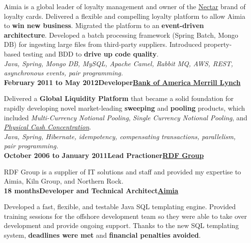\documentclass[a4paper,12pt]{article}
\newcommand{\clientwork}[3]{\textbf{#1\hfill#3\hfill#2}\nopagebreak}
\newcommand{\renewals}[1]{}
\newcommand{\techstack}[1]{\textit{#1}}
\begin{document}
Aimia is a global leader of loyalty management and owner of the \href{http://www.nectar.com/}{Nectar} brand of loyalty cards. Delivered a flexible and compelling loyalty platform to allow Aimia to \textbf{win new business}. Migrated the platform to an \textbf{event-driven architecture}. Developed a batch processing framework (Spring Batch, Mongo DB) for ingesting large files from third-party suppliers. Introduced property-based testing and BDD to \textbf{drive up code quality}.\\

\techstack{Java, Spring, Mongo DB, MySQL, Apache Camel, Rabbit MQ, AWS, REST, asynchronous events, pair programming.}\\

\clientwork{February 2011 to May 2012}{\href{http://corp.bankofamerica.com/}{Bank of America Merrill Lynch}}{Developer}

\renewals{3}


Delivered a \textbf{Global Liquidity Platform} that became a solid foundation for rapidly developing novel market-leading \textbf{sweeping} and \textbf{pooling} products, which included \emph{Multi-Currency Notional Pooling}, \emph{Single Currency Notional Pooling}, and \emph{\href{http://www.marketwatch.com/story/bank-of-america-merrill-lynch-adds-physical-cash-concentration-to-global-liquidity-platform-2012-03-19}{Physical Cash Concentration}}.\\

\techstack{Java, Spring, Hibernate, idempotency, compensating transactions, parallelism, pair programming.}\\

\clientwork{October 2006 to January 2011}{\href{http://www.rdfgroup.com/}{RDF Group}}{Lead Practioner}

RDF Group is a supplier of IT solutions and staff and provided my expertise to Aimia, Kiln Group, and Northern Rock.\\

\clientwork{18 months}{\href{http://www.aimia.com/}{Aimia}}{Developer and Technical Architect}

Developed a fast, flexible, and testable Java SQL templating engine. Provided training sessions for the offshore development team so they were able to take over development and provide ongoing support. Thanks to the new SQL templating system, \textbf{deadlines were met} and \textbf{financial penalties avoided}. \\
\end{document}

